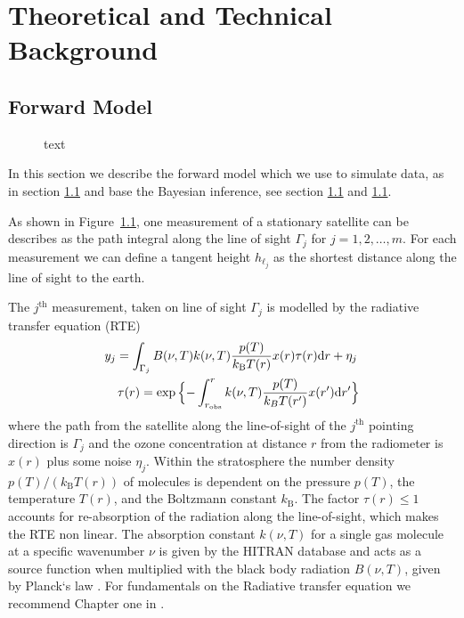 \chapter{Theoretical and Technical Background}

\section{Forward Model}

\begin{figure}[ht!]
	\centering
	\scalebox{0.9}{}
	\label{fig:FirstLIMB}
	\caption{text}
\end{figure}

In this section we describe the forward model which we use to simulate data, as in section \ref{} and base the Bayesian inference, see section \ref{} and \ref{}.

As shown in Figure~\ref{fig:FirstLIMB}, one measurement of a stationary satellite can be describes as the path integral along the line of sight $\Gamma_j$ for $j=1,2,\ldots,m$.
For each measurement we can define a tangent height $h_{\ell_j}$ as the shortest distance along the line of sight to the earth.

The $j^\text{th}$ measurement, taken on line of sight $\Gamma_j$  is modelled by the radiative transfer equation (RTE)~\cite{mipas2000handbook}
\begin{align}
	\label{eq:RTE} 
	y_j =   \int_{\Gamma_j}  B(\nu,T) k(\nu, T)   \frac{p(T)}{k_{\text{B}} T(r)}  x(r)  \tau(r) \text{d}r + \eta_j \, \\
	\tau(r) = \exp{ \Bigl\{ - \int^{r}_{r_\text{obs}}  k(\nu, T)   \frac{p(T)}{k_B T(r^{\prime})}  x(r^{\prime}) \text{d}r^{\prime} \Bigr\} }
\end{align}
where the path from the satellite along the line-of-sight of the $j^\text{th}$ pointing direction is $\Gamma_j$ and the ozone concentration at distance $r$ from the radiometer is $x(r)$ plus some noise $\eta_j$.
Within the stratosphere the number density $p(T) / (k_{\text{B}} T(r))$ of molecules is dependent on the pressure $p(T)$, the temperature $T(r)$, and the Boltzmann constant $k_{\text{B}}$.
The factor $\tau(r)\leq 1$ accounts for re-absorption of the radiation along the line-of-sight, which makes the RTE non linear.
The absorption constant $k(\nu, T)$ for a single gas molecule at a specific wavenumber $\nu$ is given by the HITRAN database \cite{gordon2022hitran2020} and acts as a source function when multiplied with the black body radiation $B(\nu,T)$, given by Planck`s law \cite{rybicki2000rte}.
For fundamentals on the Radiative transfer equation we recommend Chapter one in \cite{rybicki2000rte}.

